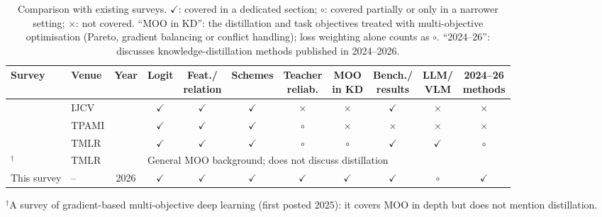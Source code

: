 \newcommand{\tY}{$\checkmark$}
\newcommand{\tP}{$\circ$}
\newcommand{\tN}{$\times$}
\begin{table}[htbp]
\centering
\caption{Comparison with existing surveys. \tY: covered in a dedicated section; \tP: covered
partially or only in a narrower setting; \tN: not covered. ``MOO in KD'': the distillation and task objectives
treated with multi-objective optimisation (Pareto, gradient balancing or conflict handling); loss
weighting alone counts as \tP. ``2024--26'': discusses knowledge-distillation methods published in
2024--2026.}
\label{tab:surveys}
\small
\setlength{\tabcolsep}{3.5pt}
\begin{tabular}{llccccccccc}
\toprule
Survey & Venue & Year & Logit & \shortstack{Feat./\\relation} & Schemes & \shortstack{Teacher\\reliab.} &
  \shortstack{MOO\\in KD} & \shortstack{Bench./\\results} & \shortstack{LLM/\\VLM} & \shortstack{2024--26\\methods} \\
\midrule
\citeauthor{gou2021kdsurvey}         & IJCV     & \citeyear{gou2021kdsurvey}         & \tY  & \tY  & \tY  & \tN   & \tN   & \tY  & \tN   & \tN   \\
\citeauthor{wang2022kdreview}        & TPAMI    & \citeyear{wang2022kdreview}        & \tY  & \tY  & \tY  & \tP & \tN   & \tN   & \tN   & \tN   \\
\citeauthor{mansourian2025kdsurvey}  & TMLR     & \citeyear{mansourian2025kdsurvey}  & \tY  & \tY  & \tY  & \tP & \tP & \tY  & \tY  & \tP \\
\citeauthor{chen2026gradmoo}$^{\dagger}$ & TMLR & \citeyear{chen2026gradmoo} & \multicolumn{8}{l}{General MOO background; does not discuss distillation} \\
\midrule
This survey                          & --       & 2026                               & \tY  & \tY  & \tY  & \tY  & \tY  & \tY  & \tP  & \tY  \\
\bottomrule
\end{tabular}

\smallskip
\footnotesize $^{\dagger}$A survey of gradient-based multi-objective deep learning (first posted 2025): it
covers MOO in depth but does not mention distillation.
\end{table}

